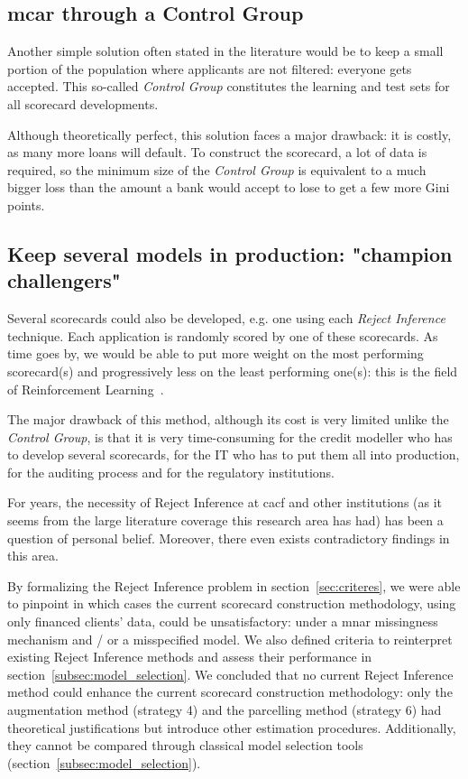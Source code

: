 \subsection{\gls{mcar} through a Control Group}

Another simple solution often stated in the literature would be to keep a small portion of the population where applicants are not filtered: everyone gets accepted. This so-called \textit{Control Group} constitutes the learning and test sets for all scorecard developments.

Although theoretically perfect, this solution faces a major drawback: it is costly, as many more loans will default. To construct the scorecard, a lot of data is required, so the minimum size of the \textit{Control Group} is equivalent to a much bigger loss than the amount a bank would accept to lose to get a few more Gini points.

\subsection{Keep several models in production: "champion challengers"}

Several scorecards could also be developed, e.g. one using each \textit{Reject Inference} technique. Each application is randomly scored by one of these scorecards. As time goes by, we would be able to put more weight on the most performing scorecard(s) and progressively less on the least performing one(s): this is the field of Reinforcement Learning~\cite{Sutton1998}.

The major drawback of this method, although its cost is very limited unlike the \textit{Control Group}, is that it is very time-consuming for the credit modeller who has to develop several scorecards, for the IT who has to put them all into production, for the auditing process and for the regulatory institutions.

\bigskip

For years, the necessity of {Reject Inference} at \gls{cacf} and other institutions (as it seems from the large literature coverage this research area has had) has been a question of personal belief. Moreover, there even exists contradictory findings in this area.

By formalizing the {Reject Inference} problem in section~\ref{sec:criteres}, we were able to pinpoint in which cases the current scorecard construction methodology, using only financed clients' data, could be unsatisfactory: under a \gls{mnar} missingness mechanism and / or a misspecified model. We also defined criteria to reinterpret existing {Reject Inference} methods and assess their performance in section~\ref{subsec:model_selection}. We concluded that no current {Reject Inference} method could enhance the current scorecard construction methodology: only the augmentation method (strategy 4) and the parcelling method (strategy 6) had theoretical justifications but introduce other estimation procedures. Additionally, they cannot be compared through classical model selection tools (section~\ref{subsec:model_selection}).

